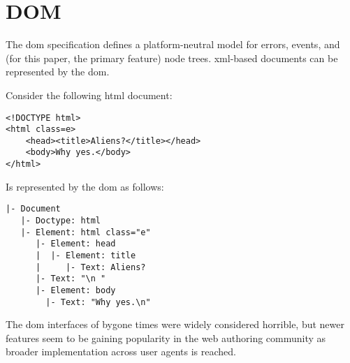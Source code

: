 
\chapter{DOM}\label{appendix-dom}

The \gls{dom} specification defines a platform-neutral model for errors,
  events, and (for this paper, the primary feature) node trees.
\acrshort{xml}-based documents can be represented by the \gls{dom}.

Consider the following \gls{html} document:

\begin{lstlisting}
<!DOCTYPE html>
<html class=e>
    <head><title>Aliens?</title></head>
    <body>Why yes.</body>
</html>
\end{lstlisting}

\noindent Is represented by the \gls{dom} as follows:

\begin{lstlisting}
|- Document
   |- Doctype: html
   |- Element: html class="e"
      |- Element: head
      |  |- Element: title
      |     |- Text: Aliens?
      |- Text: "\n "
      |- Element: body
        |- Text: "Why yes.\n"
\end{lstlisting}

\noindent The \gls{dom} interfaces of bygone times were widely considered
  horrible, but newer features seem to be gaining popularity in the web
  authoring community as broader implementation across user agents is reached.
